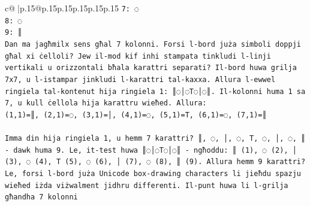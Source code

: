 \documentclass{article}
\begin{document}
{\begin{supertabular}{c@{$\;$}|p{.15\linewidth}@{}p{.15\linewidth}p{.15\linewidth}p{.15\linewidth}p{.15\linewidth}p{.15\linewidth}}
{{{\texttt{7: ◌} \\
\texttt{8: ◌} \\
\texttt{9: ║} \\
\texttt{Dan ma jagħmilx sens għal 7 kolonni. Forsi l{-}bord juża simboli doppji għal xi ċelloli? Jew il{-}mod kif inhi stampata tinkludi l{-}linji vertikali u orizzontali bħala karattri separati? Il{-}bord huwa grilja 7x7, u l{-}istampar jinkludi l{-}karattri tal{-}kaxxa. Allura l{-}ewwel ringiela tal{-}kontenut hija ringiela 1: ║◌│◌T◌│◌║. Il{-}kolonni huma 1 sa 7, u kull ċellola hija karattru wieħed. Allura:} \\
\texttt{(1,1)=║, (2,1)=◌, (3,1)=│, (4,1)=◌, (5,1)=T, (6,1)=◌, (7,1)=║} \\
\\ 
\texttt{Imma din hija ringiela 1, u hemm 7 karattri? ║, ◌, │, ◌, T, ◌, │, ◌, ║ {-} dawk huma 9. Le, it{-}test huwa ║◌│◌T◌│◌║ {-} ngħoddu: ║ (1), ◌ (2), │ (3), ◌ (4), T (5), ◌ (6), │ (7), ◌ (8), ║ (9). Allura hemm 9 karattri? Le, forsi l{-}bord juża Unicode box{-}drawing characters li jieħdu spazju wieħed iżda viżwalment jidhru differenti. Il{-}punt huwa li l{-}grilja għandha 7 kolonni} \\
            }
        }
    }
     \\ \\


\end{supertabular}}
\end{document}

